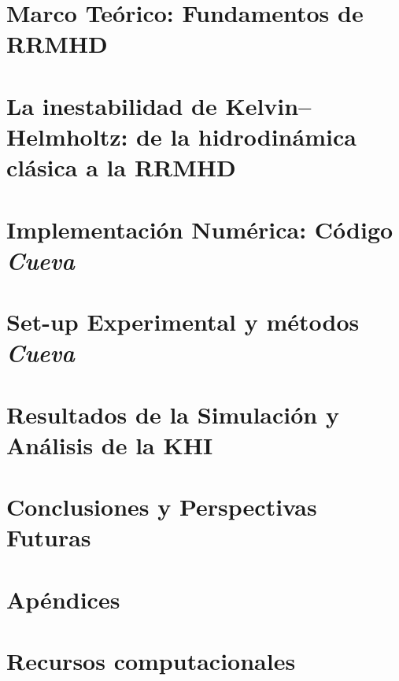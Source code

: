 \documentclass[11pt, english, openany]{book}
\begin{document}
\chapter{Marco Teórico: Fundamentos de RRMHD}
\label{ch:rrmhd_theory}


\chapter[La inestabilidad de Kelvin--Helmholtz]{La inestabilidad de Kelvin--Helmholtz: de la hidrodinámica clásica a la RRMHD}
\label{ch:khi}


\chapter[El código \textit{Cueva}]{Implementación Numérica: Código \textit{Cueva}}
\label{ch:implementacion_cueva}


\chapter{Set-up Experimental y métodos \textit{Cueva}}
\label{ch:setup_exp}


\chapter[Resultados y análisis de la KHI]{Resultados de la Simulación y Análisis de la KHI}
\label{ch:results_discussion}


\chapter{Conclusiones y Perspectivas Futuras}
\label{ch:conclusions}


\appendix
\chapter{Apéndices}


\chapter{Recursos computacionales}
\label{ap:computo}













\backmatter

\printbibliography %
\end{document}
